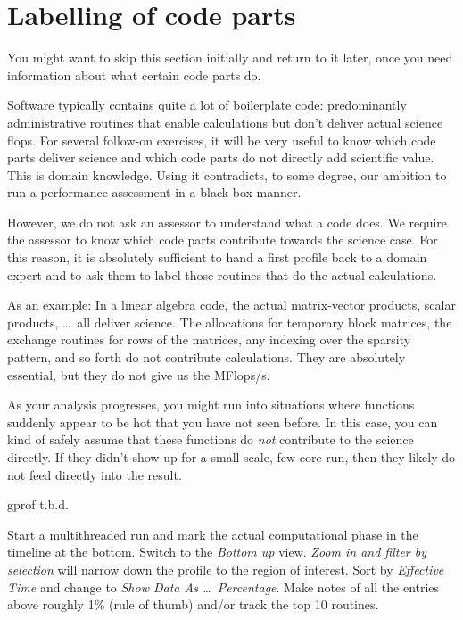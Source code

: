 \section{Labelling of code parts}
\label{section:preparation:labelling}

\begin{readerguide}
 You might want to skip this section initially and return to it later, once you need information about what certain code parts do.
\end{readerguide}


Software typically contains quite a lot of boilerplate code: 
predominantly administrative routines that enable calculations but don't deliver actual science flops. 
For several follow-on exercises, it will be very useful to know which code parts deliver science and which code parts do not directly add scientific value.
This is domain knowledge.
Using it contradicts, to some degree, our ambition to run a performance assessment in a black-box manner.


However, we do not ask an assessor to understand what a code does.
We require the assessor to know which code parts contribute towards the science case.
For this reason, it is absolutely sufficient to hand a first profile back to a domain expert and to ask them to label those routines that do the actual calculations. 

As an example: 
In a linear algebra code, the actual matrix-vector products, scalar products, \ldots~all deliver science.
The allocations for temporary block matrices, the exchange routines for rows of the matrices, any indexing over the sparsity pattern, and so forth do not contribute calculations.
They are absolutely essential, but they do not give us the MFlops/s.


As your analysis progresses, you might run into situations where functions suddenly appear to be hot that you have not seen before.
In this case, you can kind of safely assume that these functions do \emph{not} contribute to the science directly.
If they didn't show up for a small-scale, few-core run, then they likely do not feed directly into the result.

\begin{instructions}{gprof}
t.b.d.
\end{instructions}

\begin{instructions}{\vtune}
Start a multithreaded run and mark the actual computational phase in the timeline at the bottom.
Switch to the \emph{Bottom up} view.
\emph{Zoom in and filter by selection} will narrow down the profile to the region of interest.
Sort by \emph{Effective Time} and change to \emph{Show Data As \ldots~Percentage}.
Make notes of all the entries above roughly 1\% (rule of thumb) and/or track the top 10 routines. 
\end{instructions}

